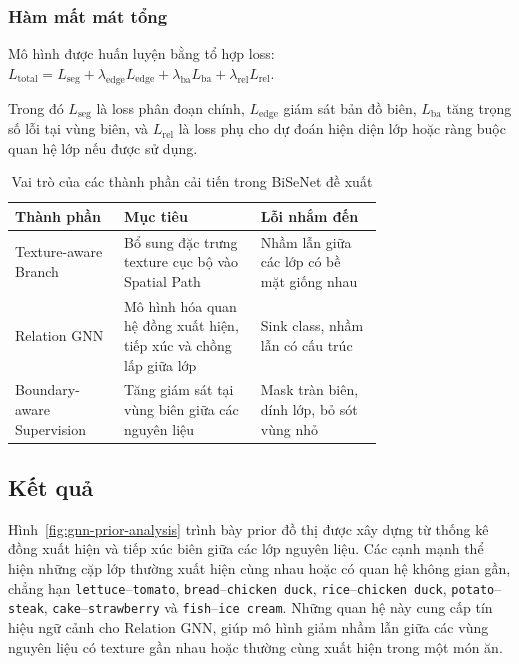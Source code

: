 \subsubsection{Hàm mất mát tổng}

Mô hình được huấn luyện bằng tổ hợp loss: $L_{\text{total}} = L_{\text{seg}} + \lambda_{\text{edge}} L_{\text{edge}} + \lambda_{\text{ba}} L_{\text{ba}} + \lambda_{\text{rel}} L_{\text{rel}}$.

Trong đó $L_{\text{seg}}$ là loss phân đoạn chính, $L_{\text{edge}}$ giám sát bản đồ biên, $L_{\text{ba}}$ tăng trọng số lỗi tại vùng biên, và $L_{\text{rel}}$ là loss phụ cho dự đoán hiện diện lớp hoặc ràng buộc quan hệ lớp nếu được sử dụng.

\begin{table}[H]
\centering
\caption{Vai trò của các thành phần cải tiến trong BiSeNet đề xuất}
\label{tab:proposed_components}
\begin{tabular}{p{0.2\linewidth}p{0.28\linewidth}p{0.25\linewidth}}
\toprule
\textbf{Thành phần} & \textbf{Mục tiêu} & \textbf{Lỗi nhắm đến} \\
\midrule
Texture-aware Branch 
& Bổ sung đặc trưng texture cục bộ vào Spatial Path 
& Nhầm lẫn giữa các lớp có bề mặt giống nhau \\
\midrule
Relation GNN 
& Mô hình hóa quan hệ đồng xuất hiện, tiếp xúc và chồng lấp giữa lớp 
& Sink class, nhầm lẫn có cấu trúc \\
\midrule
Boundary-aware Supervision 
& Tăng giám sát tại vùng biên giữa các nguyên liệu 
& Mask tràn biên, dính lớp, bỏ sót vùng nhỏ \\
\bottomrule
\end{tabular}
\end{table}

\subsection{Kết quả}

Hình~\ref{fig:gnn-prior-analysis} trình bày prior đồ thị được xây dựng từ thống kê đồng xuất hiện và tiếp xúc biên giữa các lớp nguyên liệu. Các cạnh mạnh thể hiện những cặp lớp thường xuất hiện cùng nhau hoặc có quan hệ không gian gần, chẳng hạn \texttt{lettuce}--\texttt{tomato}, \texttt{bread}--\texttt{chicken duck}, \texttt{rice}--\texttt{chicken duck}, \texttt{potato}--\texttt{steak}, \texttt{cake}--\texttt{strawberry} và \texttt{fish}--\texttt{ice cream}. Những quan hệ này cung cấp tín hiệu ngữ cảnh cho Relation GNN, giúp mô hình giảm nhầm lẫn giữa các vùng nguyên liệu có texture gần nhau hoặc thường cùng xuất hiện trong một món ăn.

